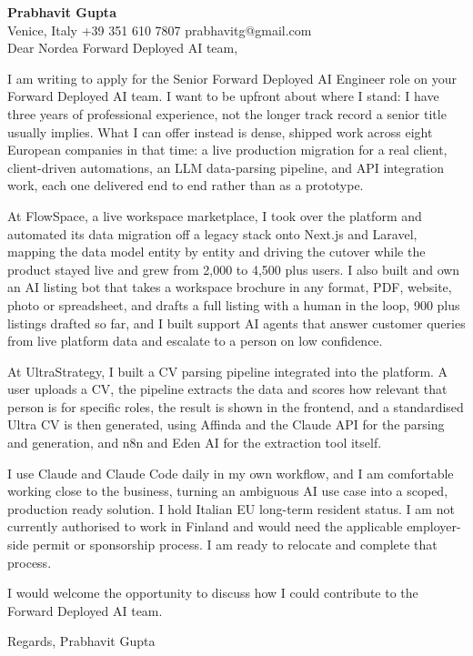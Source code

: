 \documentclass[a4paper,10.5pt]{article}
\begin{document}
\textbf{Prabhavit Gupta}\\
Venice, Italy \textbar{} +39 351 610 7807 \textbar{} prabhavitg@gmail.com\\[10pt]
Dear Nordea Forward Deployed AI team,

I am writing to apply for the Senior Forward Deployed AI Engineer role on your Forward Deployed AI team. I want to be upfront about where I stand: I have three years of professional experience, not the longer track record a senior title usually implies. What I can offer instead is dense, shipped work across eight European companies in that time: a live production migration for a real client, client-driven automations, an LLM data-parsing pipeline, and API integration work, each one delivered end to end rather than as a prototype.

At FlowSpace, a live workspace marketplace, I took over the platform and automated its data migration off a legacy stack onto Next.js and Laravel, mapping the data model entity by entity and driving the cutover while the product stayed live and grew from 2,000 to 4,500 plus users. I also built and own an AI listing bot that takes a workspace brochure in any format, PDF, website, photo or spreadsheet, and drafts a full listing with a human in the loop, 900 plus listings drafted so far, and I built support AI agents that answer customer queries from live platform data and escalate to a person on low confidence.

At UltraStrategy, I built a CV parsing pipeline integrated into the platform. A user uploads a CV, the pipeline extracts the data and scores how relevant that person is for specific roles, the result is shown in the frontend, and a standardised Ultra CV is then generated, using Affinda and the Claude API for the parsing and generation, and n8n and Eden AI for the extraction tool itself.

I use Claude and Claude Code daily in my own workflow, and I am comfortable working close to the business, turning an ambiguous AI use case into a scoped, production ready solution. I hold Italian EU long-term resident status. I am not currently authorised to work in Finland and would need the applicable employer-side permit or sponsorship process. I am ready to relocate and complete that process.

I would welcome the opportunity to discuss how I could contribute to the Forward Deployed AI team.

Regards,
Prabhavit Gupta
\end{document}
